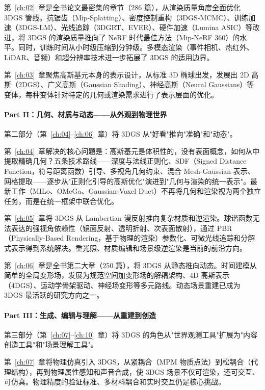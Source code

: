 第~\ref{ch:02}~章是全书论文最密集的章节（286 篇），从渲染质量角度全面优化 3DGS 管线。抗锯齿（Mip-Splatting）、密度控制重构（3DGS-MCMC）、训练加速（3DGS-LM）、光线追踪（3DGRT、EVER）、硬件加速（Lumina ASIC）等改进，将 3DGS 的渲染质量推向了 NeRF 时代最佳方法（Mip-NeRF 360）的水平。同时，训练时间从小时级压缩到分钟级。多模态渲染（事件相机、热红外、LiDAR、音频）和超分辨率技术进一步拓展了 3DGS 的适用边界。

第~\ref{ch:03}~章聚焦高斯基元本身的表示设计，从标准 3D 椭球出发，发展出 2D 高斯（2DGS）、广义高斯（Gaussian Shading）、神经高斯（Neural Gaussians）等变体，每种变体针对特定的几何或渲染需求进行了表示层面的优化。

\paragraph{Part II：几何、材质与动态——从外观到物理世界}
第二部分（第~\ref{ch:04}--\ref{ch:06}~章）将 3DGS 从"好看"推向"准确"和"动态"。

第~\ref{ch:04}~章解决的核心问题是：高斯基元是体积性的，没有表面概念，如何从中提取精确几何？五条技术路线——深度与法线正则化、SDF（Signed Distance Function，符号距离函数）引导、多视角几何约束、混合 Mesh-Gaussian 表示、网格提取——逐步从"正则化引导的高斯优化"演进到"几何与渲染的统一表示"。最新工作（MILo、OMeGa、Gaussian-Voxel Duet）不再将几何和渲染视为两个独立任务，而是在统一框架中联合优化。

第~\ref{ch:05}~章将 3DGS 从 Lambertian 漫反射推向复杂材质和逆渲染。球谐函数无法表达的强视角依赖性（镜面反射、透明折射、次表面散射），通过 PBR（Physically-Based Rendering，基于物理的渲染）参数化、可微光线追踪和分解式表示得到系统解决。重光照、材质编辑和场景级逆渲染是当前的前沿方向。

第~\ref{ch:06}~章是全书第二大章（250 篇），将 3DGS 从静态推向动态。时间建模从简单的全局变形场，发展为规范空间加变形场的解耦架构、4D 高斯表示（4DGS）、运动学骨架驱动、神经场变形等多元路线。动态场景重建已成为 3DGS 最活跃的研究方向之一。

\paragraph{Part III：生成、编辑与理解——从重建到创造}
第三部分（第~\ref{ch:07}--\ref{ch:10}~章）将 3DGS 的角色从"世界观测工具"扩展为"内容创造工具"和"场景理解工具"。

第~\ref{ch:07}~章将物理仿真引入 3DGS，从紧耦合（MPM 物质点法）到松耦合（代理结构），再到物理属性感知和声音合成，使 3DGS 场景不仅可渲染，还可交互、可仿真。物理精度的验证标准、多材料耦合和实时交互仍是核心挑战。

